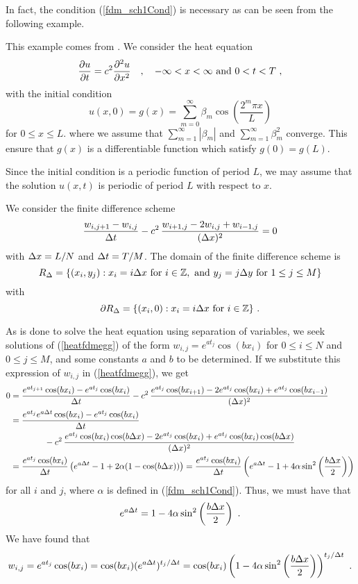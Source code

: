 In fact, the condition (\ref{fdm_sch1Cond}) is
necessary as can be seen from the following example.

\begin{egg}
This example comes from \cite{IK}.  We consider the heat equation
\[
\frac{\partial{u}}{\partial{t}} = c^2 \frac{\partial^{2}{u}}{\partial{x}^{2}} \quad , \quad
-\infty < x < \infty  \ \text{and} \ 0<t<T \ ,
\]
with the initial condition
\[
u(x,0) = g(x) = \sum_{m=0}^\infty \beta_m
\cos\left(\frac{2^m \pi x}{L}\right)
\]
for $0 \leq x \leq L$. where we assume that
$\displaystyle \sum_{m=1}^\infty|\beta_m|$ and
$\displaystyle \sum_{m=1}^\infty\beta_m^2$ converge.  This ensure that
$g(x)$ is a differentiable function which satisfy $g(0) = g(L)$.

Since the initial condition is a periodic function of period $L$, we
may assume that the solution $u(x,t)$ is periodic of period $L$
with respect to $x$.

We consider the finite difference scheme
\begin{equation}\label{heatfdmegg}
\frac{w_{i,j+1} - w_{i,j}}{\Delta{t}}  - c^2\, \frac{w_{i+1,j} - 2w_{i,j} +
w_{i-1,j}}{(\Delta{x})^2} = 0
\end{equation}
with $\Delta{x} = L/N$ and $\Delta{t} = T/M$.  The domain of the finite
difference scheme is
\[
R_\Delta = \{ (x_i,y_j) : x_i = i \Delta{x} \ \text{for} \ i \in \mathbb{Z},
\ \text{and} \ y_j = j \Delta{y} \ \text{for} \ 1 \leq j \leq M \}
\]
with
\[
\partial R_\Delta =  \{ (x_i,0) : x_i = i \Delta{x} \ \text{for} \ i \in \mathbb{Z} \}
\ .
\]

As is done to solve the heat equation using separation of variables,
we seek solutions of (\ref{heatfdmegg}) of the form
$w_{i,j} = e^{a t_j}\cos(b x_i)$ for $0\leq i \leq N$ and
$0 \leq j \leq M$, and some constants $a$ and $b$ to be determined.
If we substitute this expression of $w_{i,j}$ in (\ref{heatfdmegg}),
we get
\begin{align*}
0 &= \frac{e^{at_{j+1}}\cos(bx_i) - e^{at_j}\cos(bx_i)}{\Delta{t}}  -
c^2\, \frac{e^{at_j}\cos(bx_{i+1})  - 2 e^{at_j}\cos(bx_i) +
e^{at_j}\cos(bx_{i-1})}{(\Delta{x})^2} \\
&=\frac{e^{at_j}e^{a\Delta{t}}\cos(bx_i) - e^{at_j}\cos(bx_i)}{\Delta{t}}\\
&\qquad\qquad
- c^2\, \frac{e^{at_j}\cos(bx_i)\cos(b\Delta{x}) - 2 e^{at_j}\cos(bx_i) +
e^{at_j}\cos(bx_i)\cos(b\Delta{x})}{(\Delta{x})^2} \\
&= \frac{e^{at_j}\cos(bx_i)}{\Delta{t}} \left( e^{a\Delta{t}} - 1 + 2\alpha
(1 - \cos(b\Delta{x})) \right)
= \frac{e^{at_j}\cos(bx_i)}{\Delta{t}} \left( e^{a\Delta{t}} - 1 + 4\alpha
\sin^2\left(\frac{b\Delta{x}}{2}\right) \right)
\end{align*}
for all $i$ and $j$, where $\alpha$ is defined in
(\ref{fdm_sch1Cond}).  Thus, we must have that
\[
  e^{a\Delta{t}} = 1 - 4\alpha \sin^2\left(\frac{b\Delta{x}}{2}\right) \ .
\]
We have found that
\[
w_{i,j} = e^{at_j}\cos(bx_i) = \cos(b x_i) (e^{a\Delta{t}})^{t_j/\Delta{t}}
= \cos(b x_i) \left( 1 - 4\alpha \sin^2\left(\frac{b\Delta{x}}{2}\right)
\right)^{t_j/\Delta{t}} \ .
\]


\end{egg}
